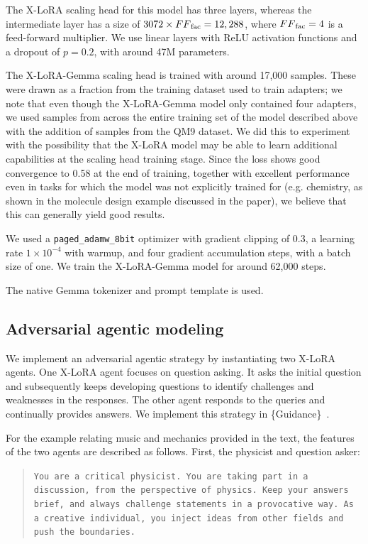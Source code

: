 The X-LoRA scaling head for this model has three layers, whereas the intermediate layer has a size of $3072\times {FF}_{\rm fac}=12,288$, where ${FF}_{\rm fac}=4$ is a feed-forward multiplier. We use linear layers with ReLU activation functions and a dropout of $p=0.2$, with around 47M parameters.

The X-LoRA-Gemma scaling head is trained with around 17,000 samples. These were drawn as a fraction from the training dataset used to train adapters; we note that even though the X-LoRA-Gemma model only contained four adapters, we used samples from across the entire training set of the model described above with the addition of samples from the QM9 dataset. We did this to experiment with the possibility that the X-LoRA model may be able to learn additional capabilities at the scaling head training stage. Since the loss shows good convergence to 0.58 at the end of training, together with excellent performance even in tasks for which the model was not explicitly trained for (e.g. chemistry, as shown in the molecule design example discussed in the paper), we believe that this can generally yield good results.

We used a \texttt{paged\_adamw\_8bit} optimizer with gradient clipping of 0.3, a learning rate $1\times 10^{-4}$ with warmup, and four gradient accumulation steps, with a batch size of one. We train the X-LoRA-Gemma model for around 62,000 steps. 

The native Gemma tokenizer and prompt template is used. 



\subsection{Adversarial agentic modeling}
We implement an adversarial agentic strategy by instantiating two X-LoRA agents. One X-LoRA agent focuses on question asking. It asks the initial question and subsequently keeps developing questions to identify challenges and weaknesses in the responses. The other agent responds to the queries and continually provides answers. We implement this strategy in \{Guidance\}~\cite{Guidance-ai/guidance:Models.}.

For the example relating music and mechanics provided in the text, the features of the two agents are described as follows. First, the physicist and question asker:
\begin{quote}
\small\texttt{You are a critical physicist. You are taking part in a discussion, from the perspective of physics.
Keep your answers brief, and always challenge statements in a provocative way.
\newline\newline
As a creative individual, you inject ideas from other fields and push the boundaries.}
\end{quote}

